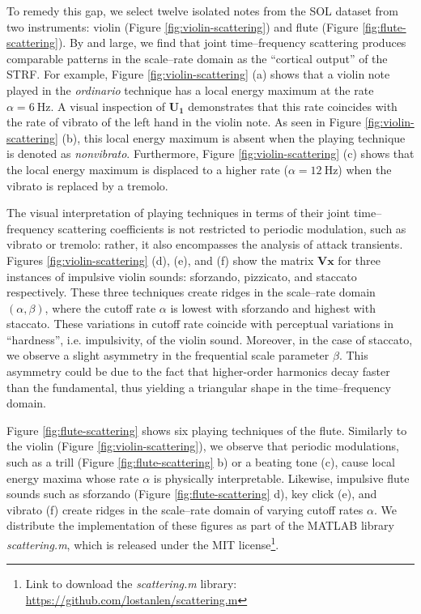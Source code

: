 \documentclass{bmcart}
\begin{document}
To remedy this gap, we select twelve isolated notes from the SOL dataset from two instruments: violin (Figure \ref{fig:violin-scattering}) and flute (Figure \ref{fig:flute-scattering}).
By and large, we find that joint time--frequency scattering produces comparable patterns in the scale--rate domain as the ``cortical output'' of the STRF.
For example, Figure \ref{fig:violin-scattering} (a) shows that a violin note played in the \emph{ordinario} technique has a local energy maximum at the rate $\alpha = \SI{6}{\hertz}$.
A visual inspection of $\mathbf{U_1}$ demonstrates that this rate coincides with the rate of vibrato of the left hand in the violin note.
As seen in Figure \ref{fig:violin-scattering} (b), this local energy maximum is absent when the playing technique is denoted as \emph{nonvibrato}.
Furthermore, Figure \ref{fig:violin-scattering} (c) shows that the local energy maximum is displaced to a higher rate ($\alpha = \SI{12}{\hertz}$) when the vibrato is replaced by a tremolo.

The visual interpretation of playing techniques in terms of their joint time--frequency scattering coefficients is not restricted to periodic modulation, such as vibrato or tremolo: rather, it also encompasses the analysis of attack transients.
Figures \ref{fig:violin-scattering} (d), (e), and (f) show the matrix $\mathbf{V}\boldsymbol{x}$ for three instances of impulsive violin sounds: sforzando, pizzicato, and staccato respectively.
These three techniques create ridges in the scale--rate domain $(\alpha, \beta)$, where the cutoff rate $\alpha$ is lowest with sforzando and highest with staccato.
These variations in cutoff rate coincide with perceptual variations in ``hardness'', i.e. impulsivity, of the violin sound.
Moreover, in the case of staccato, we observe a slight asymmetry in the frequential scale parameter $\beta$.
This asymmetry could be due to the fact that higher-order harmonics decay faster than the fundamental, thus yielding a triangular shape in the time--frequency domain.

Figure \ref{fig:flute-scattering} shows six playing techniques of the flute.
Similarly to the violin (Figure \ref{fig:violin-scattering}), we observe that periodic modulations, such as a trill (Figure \ref{fig:flute-scattering} b) or a beating tone (c), cause local energy maxima whose rate $\alpha$ is physically interpretable.
Likewise, impulsive flute sounds such as sforzando (Figure \ref{fig:flute-scattering} d), key click (e), and vibrato (f) create ridges in the scale--rate domain of varying cutoff rates $\alpha$.
We distribute the implementation of these figures as part of the MATLAB library \emph{scattering.m}, which is released under the MIT license\footnote{Link to download the \emph{scattering.m} library: \url{https://github.com/lostanlen/scattering.m}}.
\end{document}
